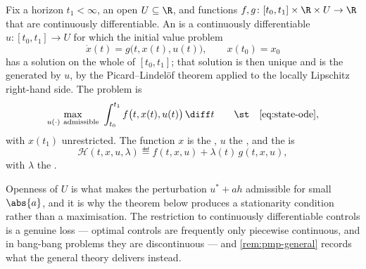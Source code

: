 \begin{definition}\label{def:control-problem}
	Fix a horizon $t_1<\infty$, an open 
	$U\subseteq\R$, and functions $f,g\colon[t_0,t_1]\times\R\times U\to\R$ that are
	continuously differentiable. An 
	is a continuously differentiable $u\colon[t_0,t_1]\to U$ for which the initial
	value problem
	\begin{equation}\label{eq:state-ode}
		\dot x(t)=g\bigl(t,x(t),u(t)\bigr),\qquad x(t_0)=x_0
	\end{equation}
	has a solution on the whole of $[t_0,t_1]$; that solution is then unique and is
	the  generated by $u$, by the
	Picard--Lindel\"of theorem \autocite[Thm.~VII.8.14, p.~235]{amann2008analysisII}
	applied to the locally Lipschitz right-hand side. The problem is
	\begin{equation}\label{eq:control-problem}
		\max_{u(\cdot)\ \text{admissible}}\ \int_{t_0}^{t_1}f\bigl(t,x(t),u(t)\bigr)\,\diff t
		\qquad\st\quad\eqref{eq:state-ode},
	\end{equation}
	with $x(t_1)$ unrestricted. The function $x$ is the , $u$ the
	, and the  is
	\begin{equation}\label{eq:hamiltonian}
		\mathcal{H}(t,x,u,\lambda)\eqdef f(t,x,u)+\lambda(t)\,g(t,x,u),
	\end{equation}
	with $\lambda$ the .
\end{definition}

Openness of $U$ is what makes the perturbation $u^{\ast}+ah$ admissible for small
$\abs{a}$, and it is why the theorem below produces a stationarity condition
rather than a maximisation. The restriction to continuously differentiable
controls is a genuine loss --- optimal controls are frequently only piecewise
continuous, and in bang-bang problems they are discontinuous --- and
\autoref{rem:pmp-general} records what the general theory delivers instead.

